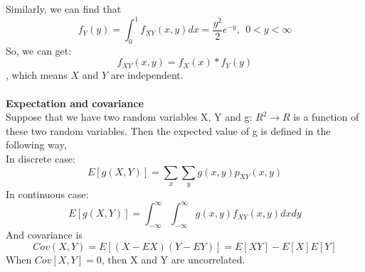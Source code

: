 \documentclass[a4paper,12pt]{article}
\begin{document}
Similarly, we can find that $$f_Y(y) = \int_0^1 f_{XY}(x,y)dx = \frac{y^2}{2}e^{-y}, \ \ 0<y<\infty$$
So, we can get: $$f_{XY}(x,y) = f_X(x)*f_Y(y)$$, which means $X$ and $Y$ are independent.
\\
\\
\textbf{Expectation and covariance}\\
Suppose that we have two random variables X, Y and g: $R^2 \rightarrow R$ is a function of these two random variables. Then the expected value of g is defined in the following way,\\
In discrete case: \\
$$E[g(X,Y)] = \sum_x \sum_y g(x,y) p_{XY}(x,y)$$
In continuous case: \\
$$E[g(X,Y)] = \int_{-\infty}^{\infty} \int_{-\infty}^{\infty} g(x,y) f_{XY}(x,y)dxdy$$
And covariance is 
$$Cov(X,Y) = E[(X - EX)(Y - EY)] = E[XY] - E[X]E[Y]$$
When $Cov[X,Y] = 0$, then X and Y are uncorrelated.
\newpage
\printbibliography
\end{document}
